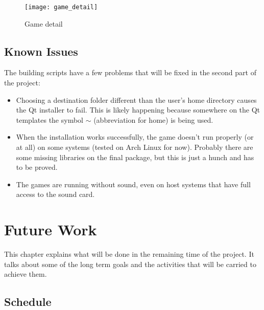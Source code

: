 

\begin{figure}[h!]
\centering
\texttt{[image: game\_detail]}
\caption{Game detail}
\label{fig:game_detail}
\end{figure}

\section{Known Issues}
\label {sec:issues}

The building scripts have a few problems that will be fixed in the second part of the project:

\begin{itemize}
\item Choosing a destination folder different than the user's home directory causes the Qt installer to fail. This is likely happening because somewhere on the Qt templates the symbol $\sim$ (abbreviation for home) is being used.

\item When the installation works successfully, the game doesn't run properly (or at all) on some systems (tested on Arch Linux for now). Probably there are some missing libraries on the final package, but this is just a hunch and has to be proved.

\item The games are running without sound, even on host systems that have full access to the sound card.
\end{itemize}


\chapter{Future Work}
\label{sec:future_work}

This chapter explains what will be done in the remaining time of the project. It talks about some of the long term goals and the activities that will be carried to achieve them.

\section{Schedule}
\label{sec:schedule}


